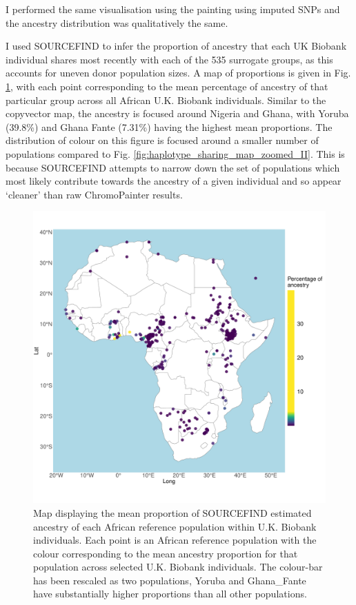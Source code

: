 I performed the same visualisation using the painting using imputed SNPs and the ancestry distribution was qualitatively the same. 

I used SOURCEFIND to infer the proportion of ancestry that each UK Biobank individual shares most recently with each of the 535 surrogate groups, as this accounts for uneven donor population sizes. A map of proportions is given in Fig. \ref{fig:SF_props_map}, with each point corresponding to the mean percentage of ancestry of that particular group across all African U.K. Biobank individuals. Similar to the copyvector map, the ancestry is focused around Nigeria and Ghana, with Yoruba (39.8\%) and Ghana Fante (7.31\%) having the highest mean proportions. The distribution of colour on this figure is focused around a smaller number of populations compared to Fig. \ref{fig:haplotype_sharing_map_zoomed_II}. This is because SOURCEFIND attempts to narrow down the set of populations which most likely contribute towards the ancestry of a given individual and so appear `cleaner' than raw ChromoPainter results. 

\begin{figure}[htp]
    \centering
    \includegraphics[width=1.0\textwidth]{../images/chapter3/SF_props_map.pdf}
    \caption{Map displaying the mean proportion of SOURCEFIND estimated ancestry of each African reference population within U.K. Biobank individuals. Each point is an African reference population with the colour corresponding to the mean ancestry proportion for that population across selected U.K. Biobank individuals. The colour-bar has been rescaled as two populations, Yoruba and Ghana\_Fante have substantially higher proportions than all other populations.} 
    \label{fig:SF_props_map}
\end{figure}


